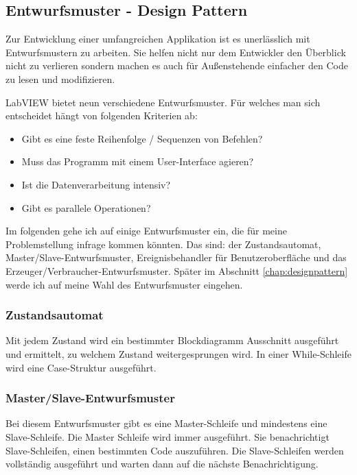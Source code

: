 	\subsection{Entwurfsmuster - Design Pattern}
	\label{chap:entwurfsmuster}
Zur Entwicklung einer umfangreichen Applikation ist es unerlässlich mit Entwurfsmustern zu arbeiten. Sie helfen nicht nur dem Entwickler den Überblick nicht zu verlieren sondern machen es auch für Außenstehende einfacher den Code zu lesen und modifizieren.

LabVIEW bietet neun verschiedene Entwurfsmuster. Für welches man sich entscheidet hängt von folgenden Kriterien ab:
\begin{itemize}
	\item Gibt es eine feste Reihenfolge / Sequenzen von Befehlen?
	\item Muss das Programm mit einem User-Interface agieren?
	\item Ist die Datenverarbeitung intensiv? 
	\item Gibt es parallele Operationen?
\end{itemize}

Im folgenden gehe ich auf einige Entwurfsmuster ein, die für meine Problemstellung infrage kommen könnten. Das sind: der Zustandsautomat, Master/Slave-Entwurfsmuster, Ereignisbehandler für Benutzeroberfläche und das Erzeuger/Verbraucher-Entwurfsmuster. Später im Abschnitt \ref{chap:designpattern} werde ich auf meine Wahl des Entwurfsmuster eingehen.

\subsubsection{Zustandsautomat}%
Mit jedem Zustand wird ein bestimmter Blockdiagramm Ausschnitt ausgeführt und ermittelt, zu welchem Zustand weitergesprungen wird. In einer While-Schleife wird eine Case-Struktur ausgeführt. 
	
\subsubsection{Master/Slave-Entwurfsmuster}
Bei diesem Entwurfsmuster gibt es eine Master-Schleife und mindestens eine Slave-Schleife. Die Master Schleife wird immer ausgeführt. Sie benachrichtigt Slave-Schleifen, einen bestimmten Code auszuführen. Die Slave-Schleifen werden vollständig ausgeführt und warten dann auf die nächste Benachrichtigung.

